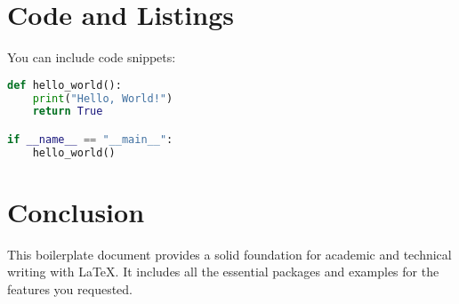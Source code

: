 \documentclass[12pt,a4paper]{article}
\begin{document}
\section{Code and Listings}

You can include code snippets:

\begin{lstlisting}[language=Python, caption=Sample Python code, label=lst:python]
def hello_world():
    print("Hello, World!")
    return True

if __name__ == "__main__":
    hello_world()
\end{lstlisting}

\section{Conclusion}

This boilerplate document provides a solid foundation for academic and technical writing with LaTeX. It includes all the essential packages and examples for the features you requested.

\newpage
\printbibliography
\end{document}
